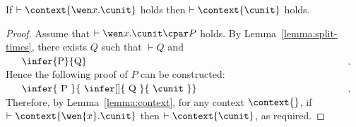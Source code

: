 \documentclass[UKenglish,acmsmall,authorversion]{acmart}
\theoremstyle{plain}
\begin{document}

\begin{lemma}
\label{lemma:co-tidynew}
If $\vdash \context{ \wen x. \cunit }$ holds
then $\vdash \context{ \cunit }$ holds.
\end{lemma}
\begin{proof}
Assume that $\vdash \wen x. \cunit \cpar P$ holds.
By Lemma~\ref{lemma:split-times}, there exists $Q$ such that $\vdash Q$ and $\vcenter{\infer{P}{Q}}$.
Hence the following proof of $P$ can be constructed:
$
\vcenter{
\infer{
P
}{
\infer[]{
Q
}{
\cunit
}}}
$.
Therefore, by Lemma~\ref{lemma:context}, for any context $\context{}$, if $\vdash \context{\wen{x}. \cunit}$ then $\vdash \context{ \cunit }$, as required.
\end{proof}
\end{document}
